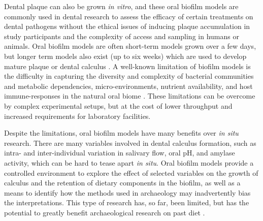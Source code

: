 \documentclass[10pt,a4paper]{article}
\begin{document}
Dental plaque can also be grown \emph{in vitro}, and these oral biofilm
models are commonly used in dental research to assess the efficacy of
certain treatments on dental pathogens
\cite{filochePlaqueMicrocosm2007, extercateAAA2010} without the ethical
issues of inducing plaque accumulation in study participants and the
complexity of access and sampling in humans or animals. Oral biofilm
models are often short-term models grown over a few days, but longer
term models also exist (up to six weeks) which are used to develop
mature plaque or dental calculus
\cite{middletonVitroCalculus1965, sissonsMultistationPlaque1991, wongCalciumPhosphate2002, velskoConsistentReproducible2018}.
A well-known limitation of biofilm models is the difficulty in capturing
the diversity and complexity of bacterial communities and metabolic
dependencies, micro-environments, nutrient availability, and host
immune-responses in the natural oral biome
\cite{edlundUncoveringComplex2018, bjarnsholtVivoBiofilm2013, velskoConsistentReproducible2018, velskoCytokineResponse2017}.
These limitations can be overcome by complex experimental setups, but at
the cost of lower throughput and increased requirements for laboratory
facilities.

Despite the limitations, oral biofilm models have many benefits over
\emph{in situ} research. There are many variables involved in dental
calculus formation, such as intra- and inter-individual variation in
salivary flow, oral pH, and amylase activity, which can be hard to tease
apart \emph{in situ}. Oral biofilm models provide a controlled
environment to explore the effect of selected variables on the growth of
calculus and the retention of dietary components in the biofilm, as well
as a means to identify how the methods used in archaeology may
inadvertently bias the interpretations. This type of research has, so
far, been limited, but has the potential to greatly benefit
archaeological research on past diet \cite{radiniDirtyTeeth2022}.
\end{document}
